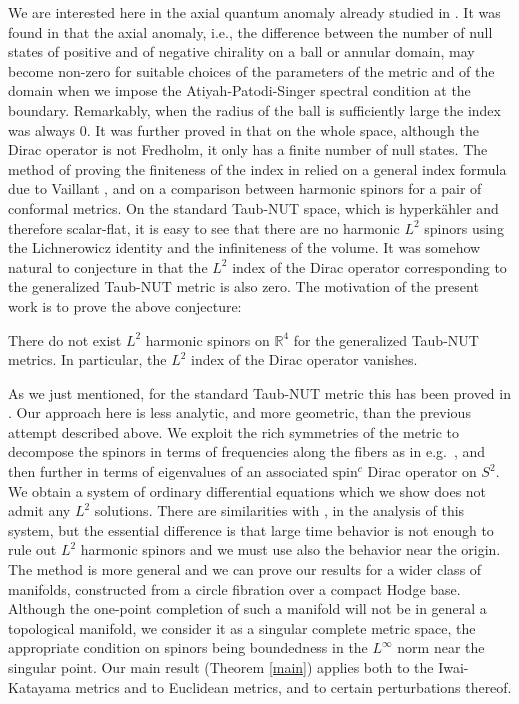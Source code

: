 \documentclass[12pt]{amsart}
\begin{document}
We are interested here in the axial quantum anomaly already studied in 
\cite{CMV, MV}. It was found in \cite{CMV} that the axial anomaly, 
i.e., the 
difference between the number of null states of positive and of negative 
chirality on a ball or annular domain,
may become non-zero for suitable choices of the parameters of the metric 
and of the domain when we impose the Atiyah-Patodi-Singer spectral condition 
at the boundary. Remarkably, when the radius of the ball is sufficiently 
large the index was always $0$. It was further proved in \cite{MV} that on 
the whole space, although the Dirac operator is not Fredholm, it only has 
a finite number of null states. The method of proving the finiteness of 
the index in \cite{MV} relied on a general index formula due to Vaillant 
\cite{boris}, and on a comparison between harmonic spinors for a pair of 
conformal metrics. On the standard Taub-NUT space, which is hyperk\"ahler 
and therefore scalar-flat, it is easy to see that there are no harmonic 
$L^2$ spinors using the Lichnerowicz identity and the infiniteness 
of the volume. It was somehow 
natural to conjecture in \cite{MV} that the $L^2$ index of the Dirac 
operator corresponding to the generalized Taub-NUT metric is also zero. 
The motivation of the present work is to prove the above conjecture:

\begin{theorem}\label{th1}
There do not exist $L^2$ harmonic spinors on ${{\mathbb R}}^4$ for the 
generalized Taub-NUT metrics. In particular, the $L^2$ index of the
Dirac operator 
vanishes.
\end{theorem}

As we just mentioned, for the standard Taub-NUT metric this has been proved in 
\cite{MV}. Our approach here is less analytic, and more geometric, than the 
previous attempt
described above. We exploit the rich symmetries of the metric to decompose the 
spinors in terms of frequencies along the fibers as in e.g.\ \cite{nistor},
and then further in terms of eigenvalues of an associated $\mathrm{spin}^c$ 
Dirac operator on $S^2$. We obtain a system of ordinary differential equations
which we show does not admit any $L^2$ solutions. There are similarities
with \cite{lott}, \cite{ANSER07} in the analysis of this system, but 
the essential difference is that large time behavior is not enough 
to rule out $L^2$ harmonic spinors and we must use also the behavior near 
the origin. The method is more general and we can prove
our results for a wider class of manifolds, constructed from a circle
fibration over a compact Hodge base. Although the one-point completion 
of such a manifold will not be in general a topological manifold, we
consider it as a singular complete metric space, the appropriate condition on 
spinors being boundedness in the $L^\infty$ norm near the singular point.
Our main result (Theorem \ref{main})
applies both to the Iwai-Katayama metrics and to Euclidean metrics, 
and to certain perturbations thereof.
\end{document}

